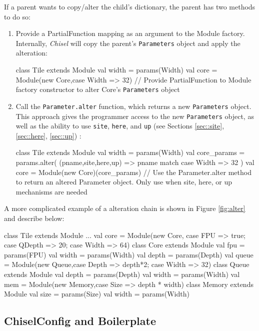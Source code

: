 \documentclass[10pt,twocolumn]{article}
\def\code#1{{\small\tt #1}}
\begin{document}
If a parent wants to copy/alter the child's dictionary, the parent has two methods to do so:
\begin{enumerate}
  \item Provide a PartialFunction mapping as an argument to the Module factory. Internally, {\em Chisel} will copy the parent's \code{Parameters} object and apply the alteration:
\begin{scala}
class Tile extends Module { 
  val width = params(Width)
  val core = Module(new Core,{case Width => 32})
  // Provide PartialFunction to Module factory constructor to alter Core's \code{Parameters} object
}
\end{scala}
  \item Call the \code{Parameter.alter} function, which returns a new \code{Parameters} object. This approach gives the programmer access to the new \code{Parameters} object, as well as the ability to use \code{site}, \code{here}, and \code{up} (see Sections \ref{sec::site}, \ref{sec::here}, \ref{sec::up}) :
\begin{scala}
class Tile extends Module { 
  val width = params(Width)
  val core_params = params.alter(
    (pname,site,here,up) => pname match {
      case Width => 32
    })
  val core = Module(new Core)(core_params)
  // Use the Parameter.alter method to return an altered Parameter object. Only use when site, here, or up mechanisms are needed
}
\end{scala}
\end{enumerate}
A more complicated example of a alteration chain is shown in Figure \ref{fig:alter} and describe below:
\begin{scala}
class Tile extends Module { 
  ...
  val core = Module(new Core, {case FPU => true; case QDepth => 20; case Width => 64})
}
class Core extends Module {
  val fpu = params(FPU)
  val width = params(Width)
  val depth = params(Depth)
  val queue = Module(new Queue,{case Depth => depth*2; case Width => 32})
}
class Queue extends Module {
  val depth = params(Depth)
  val width = params(Width)
  val mem = Module(new Memory,{case Size => depth * width})
}
class Memory extends Module {
  val size = params(Size)
  val width = params(Width)
}
\end{scala}

\subsection{ChiselConfig and Boilerplate}
\end{document}
